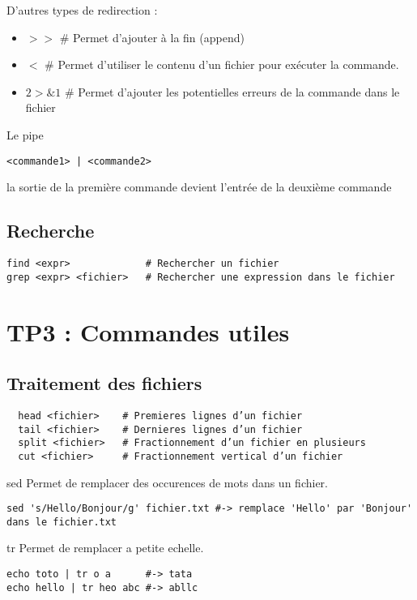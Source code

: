 \documentclass{article}
\begin{document}
D'autres types de redirection :

\begin{itemize}
  \item $>>$    \# Permet d'ajouter à la fin (append)
  \item $<$    \# Permet d'utiliser le contenu d'un fichier pour exécuter la commande.
  \item $2>\&1$ \# Permet d'ajouter les potentielles erreurs de la commande dans le fichier
\end{itemize}

Le pipe 
\begin{lstlisting}
<commande1> | <commande2>
\end{lstlisting}
 la sortie de la première commande devient l'entrée de la deuxième commande

\subsection{Recherche}
\begin{lstlisting}
find <expr>             # Rechercher un fichier
grep <expr> <fichier>   # Rechercher une expression dans le fichier
\end{lstlisting}

\section{TP3 : Commandes utiles}

\subsection{Traitement des fichiers}
\begin{lstlisting}
  head <fichier>    # Premieres lignes d’un fichier
  tail <fichier>    # Dernieres lignes d’un fichier
  split <fichier>   # Fractionnement d’un fichier en plusieurs
  cut <fichier>     # Fractionnement vertical d’un fichier  
\end{lstlisting}

sed
Permet de remplacer des occurences de mots dans un fichier.
\begin{lstlisting}
sed 's/Hello/Bonjour/g' fichier.txt #-> remplace 'Hello' par 'Bonjour' dans le fichier.txt
\end{lstlisting}

tr
Permet de remplacer a petite echelle.

\begin{lstlisting}
echo toto | tr o a      #-> tata
echo hello | tr heo abc #-> abllc
\end{lstlisting}
\end{document}
